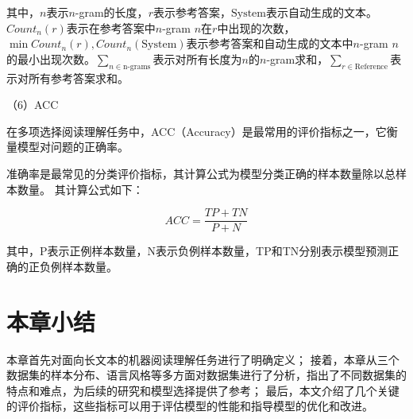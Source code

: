 其中，$n$表示$n$-gram的长度，$r$表示参考答案，$\text{System}$表示自动生成的文本。$Count_n(r)$表示在参考答案中$n$-gram $n$在$r$中出现的次数，$\min{Count_n(r), Count_n(\text{System})}$表示参考答案和自动生成的文本中$n$-gram $n$的最小出现次数。$\sum\limits_{n\in\text{n-grams}}$表示对所有长度为$n$的$n$-gram求和，$\sum\limits_{r\in\text{Reference}}$表示对所有参考答案求和。


（6）ACC

在多项选择阅读理解任务中，ACC（Accuracy）是最常用的评价指标之一，它衡量模型对问题的正确率。

准确率是最常见的分类评价指标，其计算公式为模型分类正确的样本数量除以总样本数量。
其计算公式如下：

$$ACC=\frac{TP+TN}{P+N}$$

其中，P表示正例样本数量，N表示负例样本数量，TP和TN分别表示模型预测正确的正负例样本数量。

\section{本章小结}
本章首先对面向长文本的机器阅读理解任务进行了明确定义；
接着，本章从三个数据集的样本分布、语言风格等多方面对数据集进行了分析，指出了不同数据集的特点和难点，为后续的研究和模型选择提供了参考；
最后，本文介绍了几个关键的评价指标，这些指标可以用于评估模型的性能和指导模型的优化和改进。
